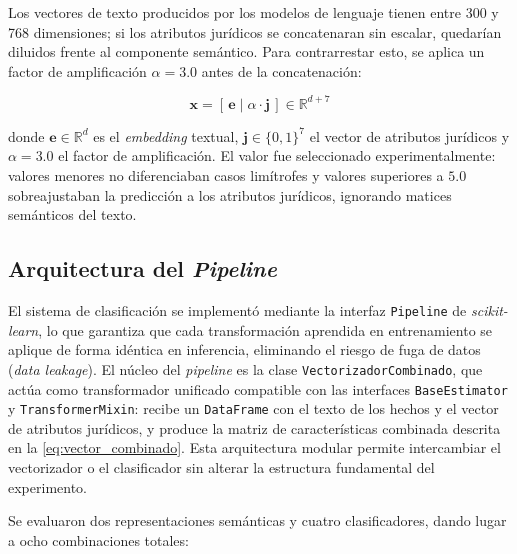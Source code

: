 Los vectores de texto producidos por los modelos de lenguaje tienen entre 300 y 
768 dimensiones; si los atributos jurídicos se concatenaran sin escalar, quedarían 
diluidos frente al componente semántico. Para contrarrestar esto, se aplica un 
factor de amplificación $\alpha = 3.0$ antes de la concatenación:

\begin{equation}
  \mathbf{x} = \left[\, \mathbf{e} \;\Big|\; \alpha \cdot \mathbf{j}
  \,\right] \in \mathbb{R}^{d+7}
  \label{eq:vector_combinado}
\end{equation}

donde $\mathbf{e} \in \mathbb{R}^{d}$ es el \textit{embedding} textual, 
$\mathbf{j} \in \{0,1\}^{7}$ el vector de atributos jurídicos y $\alpha = 3.0$ 
el factor de amplificación. El valor fue seleccionado experimentalmente: valores 
menores no diferenciaban casos limítrofes y valores superiores a $5.0$ 
sobreajustaban la predicción a los atributos jurídicos, ignorando matices 
semánticos del texto.

\subsection{Arquitectura del \textit{Pipeline}}
\label{subsec:arquitectura_pipeline}

El sistema de clasificación se implementó mediante la interfaz \texttt{Pipeline} 
de \textit{scikit-learn}, lo que garantiza que cada transformación aprendida en 
entrenamiento se aplique de forma idéntica en inferencia, eliminando el riesgo de 
fuga de datos (\textit{data leakage}).\cite{pedregosa2011} El núcleo del 
\textit{pipeline} es la clase \texttt{VectorizadorCombinado}, que actúa como 
transformador unificado compatible con las interfaces \texttt{BaseEstimator} y 
\texttt{TransformerMixin}: recibe un \texttt{DataFrame} con el texto de los hechos 
y el vector de atributos jurídicos, y produce la matriz de características 
combinada descrita en la \cref{eq:vector_combinado}. Esta arquitectura modular 
permite intercambiar el vectorizador o el clasificador sin alterar la estructura 
fundamental del experimento.

Se evaluaron dos representaciones semánticas y cuatro clasificadores, dando lugar 
a ocho combinaciones totales:


